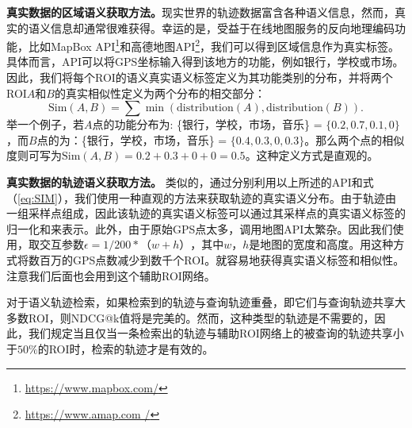 \vspace{2mm}
\noindent\textbf{真实数据的区域语义获取方法。}现实世界的轨迹数据富含各种语义信息，然而，真实的语义信息却通常很难获得。幸运的是，受益于在线地图服务的反向地理编码功能，比如MapBox API\footnote{\url{https://www.mapbox.com/}}和高德地图API\footnote{\url{https://www.amap.com /}}，我们可以得到区域信息作为真实标签。具体而言，API可以将GPS坐标输入得到该地方的功能，例如银行，学校或市场。因此，我们将每个ROI的语义真实语义标签定义为其功能类别的分布，并将两个ROI$A$和$B$的真实相似性定义为两个分布的相交部分：
\begin{equation}
\mathrm{Sim}(A,B) = \sum{\min\left(\text{distribution}(A),{\text{distribution}(B)}\right)}.
\label{eq:SIM}
\end{equation}
举一个例子，若$A$点的功能分布为: \{银行，学校，市场，音乐\} = $\{0.2, 0.7, 0.1, 0\}$，而$B$点的为：\{银行，学校，市场，音乐\} = $\{0.4, 0.3, 0, 0.3\}$。那么两个点的相似度则可写为$\mathrm{Sim}(A,B) = 0.2 + 0.3 + 0 + 0 = 0.5$。这种定义方式是直观的。

\vspace{2mm}
\textbf{真实数据的轨迹语义获取方法。} 
类似的，通过分别利用以上所述的API和式（\ref{eq:SIM}），我们使用一种直观的方法来获取轨迹的真实语义分布。由于轨迹由一组采样点组成，因此该轨迹的真实语义标签可以通过其采样点的真实语义标签的归一化和来表示。此外，由于原始GPS点太多，调用地图API太繁杂。因此我们使用，取交互参数$\epsilon = 1/200 *（w + h）$，其中$ w，h $是地图的宽度和高度。用这种方式将数百万的GPS点数减少到数千个ROI。就容易地获得真实语义标签和相似性。注意我们后面也会用到这个辅助ROI网络。

对于语义轨迹检索，如果检索到的轨迹与查询轨迹重叠，即它们与查询轨迹共享大多数ROI，则NDCG@k值将是完美的。然而，这种类型的轨迹是不需要的，因此，我们规定当且仅当一条检索出的轨迹与辅助ROI网络上的被查询的轨迹共享小于$50\%$的ROI时，检索的轨迹才是有效的。


